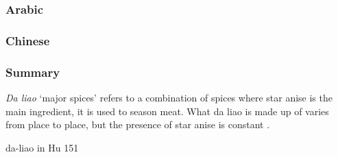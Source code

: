 

\subsubsection{Arabic}



\subsubsection{Chinese}



\subsubsection{Summary}










\textit{Da liao} `major spices' refers to a combination of spices where star anise is the main ingredient, it is used to season meat. What da liao is made up of varies from place to place, but the presence of star anise is constant \parencite[152]{}.  

da-liao in Hu 151












